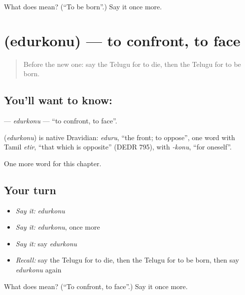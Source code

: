 \begin{tcolorbox}[breakable,colback=teal!4,colframe=teal!35!black,title={Before you move on}]
What does  mean? (\textquotedblleft{}To be born\textquotedblright{}.) Say it once more.
\end{tcolorbox}
\section[\texorpdfstring{\te{ఎదుర్కొను} (edurkonu)}{ఎదుర్కొను (edurkonu)}]{ (edurkonu) — to confront, to face}

\label{lesson:TE-C208-edurkonu}



\begin{quote}
Before the new one: say the Telugu for to die, then the Telugu for to be born.
\end{quote}

\subsection*{You'll want to know: }
\textbf{} — \emph{edurkonu} — \textquotedblleft{}to confront, to face\textquotedblright{}.

\begin{cousinweb}
\textbf{} (\emph{edurkonu}) is native Dravidian: \emph{eduru}, \textquotedblleft{}the front; to oppose\textquotedblright{}, one word with Tamil \emph{etir}, \textquotedblleft{}that which is opposite\textquotedblright{} (DEDR 795), with \emph{-konu}, \textquotedblleft{}for oneself\textquotedblright{}.
\end{cousinweb}

\begin{grammarlens}[title={What you've built}]
One more word for this chapter.
\end{grammarlens}

\subsection*{Your turn}
\begin{itemize}
\raggedright
  \item \emph{Say it:} \emph{edurkonu}
  \item \emph{Say it:} \emph{edurkonu}, once more
  \item \emph{Say it:} say \emph{edurkonu}
  \item \emph{Recall:} say the Telugu for to die, then the Telugu for to be born, then say \emph{edurkonu} again
\end{itemize}

\begin{tcolorbox}[breakable,colback=teal!4,colframe=teal!35!black,title={Before you move on}]
What does  mean? (\textquotedblleft{}To confront, to face\textquotedblright{}.) Say it once more.
\end{tcolorbox}

